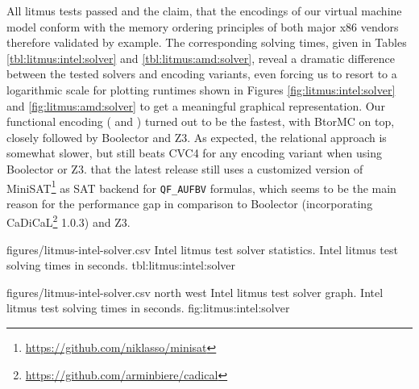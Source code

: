 All litmus tests passed and the claim, that the encodings of our virtual machine model conform with the memory ordering principles of both major x86 vendors therefore validated by example.
The corresponding solving times, given in Tables \ref{tbl:litmus:intel:solver} and \ref{tbl:litmus:amd:solver}, reveal a dramatic difference
between the tested solvers and encoding variants,
even forcing us to resort to
a logarithmic scale for plotting runtimes  shown in Figures \ref{fig:litmus:intel:solver} and \ref{fig:litmus:amd:solver} to get a meaningful graphical representation.
Our functional encoding ({\BTOR} and {\SMTLIB}) turned out to be the fastest, with BtorMC on top, closely followed by Boolector and Z3.
As expected, the relational {\SMTLIB} approach is somewhat slower, but still beats CVC4 for any encoding variant when using Boolector or Z3.
that the latest release still uses a customized version of MiniSAT\footnote{\url{https://github.com/niklasso/minisat}} %
as SAT backend for \texttt{QF_AUFBV} formulas, which seems to be the main reason
for the performance gap
in comparison to Boolector (incorporating CaDiCaL\footnote{\url{https://github.com/arminbiere/cadical}} 1.0.3) and Z3.

\newpage

\SolverStatsTable
  {figures/litmus-intel-solver.csv}
  {\textnumero}
  {\IntelRowHeader}
  {Intel litmus test solver statistics.}
  {Intel litmus test solving times in seconds.}
  {tbl:litmus:intel:solver}

\SolverStatsGraph
  {figures/litmus-intel-solver.csv}
  {north west}
  {Intel litmus test solver graph.}
  {Intel litmus test solving times in seconds.}
  {fig:litmus:intel:solver}

\newpage


